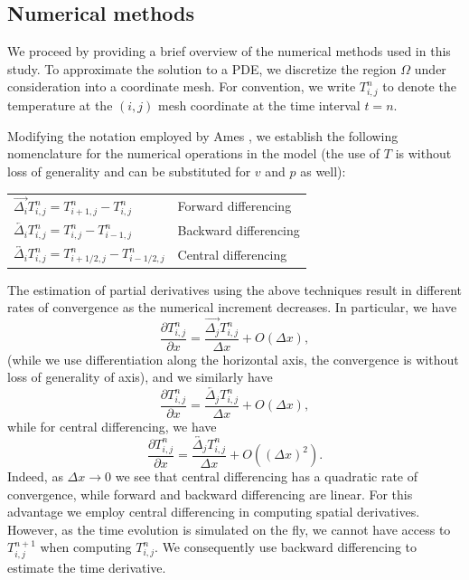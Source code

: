 \documentclass[12pt]{amsart}
\newcommand{\la}{\overleftarrow}
\newcommand{\ra}{\overrightarrow}
\newcommand{\ca}{\overleftrightarrow}
\begin{document}
\subsection{Numerical methods}

We proceed by providing a brief overview of the numerical methods used in
this study. To approximate the solution to a PDE, we discretize the region
$\Omega$ under consideration into a coordinate mesh. For convention, we
write $T_{i,j}^{n}$ to denote the temperature at the $(i,j)$ mesh coordinate
at the time interval $t=n$. 

Modifying the notation employed by Ames \cite{ames}, we establish the
following nomenclature for the numerical operations in the model (the use of $T$
is without loss of generality and can be substituted for $v$ and $p$ as well):

\begin{center}
    \begin{tabular}[]{ll}
        $\ra{\Delta_i} T_{i,j}^n = T_{i+1,j}^n - T_{i,j}^n$ & Forward
        differencing \\
        $\la{\Delta_i} T_{i,j}^n = T_{i,j}^n - T_{i-1,j}^n$ & Backward differencing \\
        $\ca{\Delta_i} T_{i,j}^n = T_{i+1/2,j}^n - T_{i-1/2,j}^n$ & Central differencing
    \end{tabular}
\end{center}

The estimation of partial derivatives using the above techniques result in
different rates of convergence as the numerical increment decreases. In
particular, we have
\begin{equation}
    \frac{\partial T_{i,j}^n}{\partial x} = \frac{\ra{\Delta_j}T_{i,j}^n}{\Delta
    x}+ O(\Delta x),
    \label{eq:\theequation}
\end{equation}
(while we use differentiation along the horizontal axis, the
convergence is without loss of generality of axis), and we similarly have
\begin{equation}
    \frac{\partial T_{i,j}^n}{\partial x} = \frac{\la{\Delta_j}T_{i,j}^n}{\Delta
    x} + O(\Delta x),
    \label{eq:\theequation}
\end{equation}
while for central differencing, we have
\begin{equation}
     \frac{\partial T_{i,j}^n}{\partial x} = \frac{\ca{\Delta_j}T_{i,j}^n}{\Delta
    x} + O((\Delta x)^2).
    \label{eq:\theequation}
\end{equation}
Indeed, as $\Delta x \to 0$ we see that central differencing has a quadratic
rate of convergence, while forward and backward differencing are linear. For
this advantage we employ central differencing in computing spatial derivatives.
However, as the time evolution is simulated on the fly, we cannot have access to
$T_{i,j}^{n+1}$ when computing $T_{i,j}^n$. We consequently use backward
differencing to estimate the time derivative.
\end{document}
